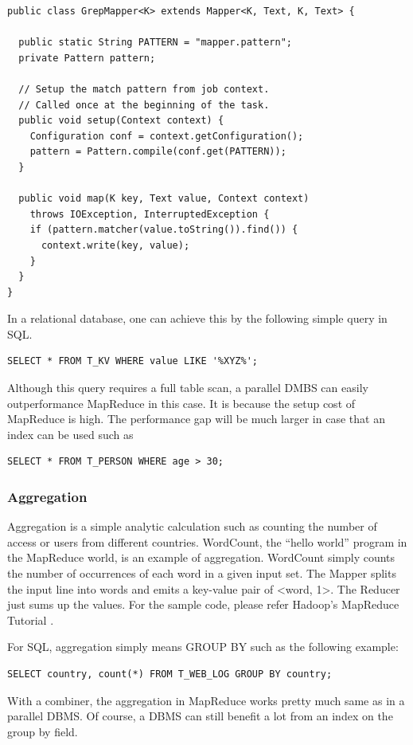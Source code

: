 \documentclass[12pt]{book}
\begin{document}
\begin{lstlisting}
public class GrepMapper<K> extends Mapper<K, Text, K, Text> {

  public static String PATTERN = "mapper.pattern";
  private Pattern pattern;

  // Setup the match pattern from job context.
  // Called once at the beginning of the task.
  public void setup(Context context) {
    Configuration conf = context.getConfiguration();
    pattern = Pattern.compile(conf.get(PATTERN));
  }

  public void map(K key, Text value, Context context)
    throws IOException, InterruptedException {
    if (pattern.matcher(value.toString()).find()) {
      context.write(key, value);
    }
  }
}
\end{lstlisting}
In a relational database, one can achieve this by the following simple query in SQL.

\lstset{language=SQL}
\begin{lstlisting}
SELECT * FROM T_KV WHERE value LIKE '%XYZ%';
\end{lstlisting}
Although this query requires a full table scan, a parallel DMBS can easily outperformance MapReduce in this case. It is because the setup cost of MapReduce is high.
The performance gap will be much larger in case that an index can be used such as

\begin{lstlisting}
SELECT * FROM T_PERSON WHERE age > 30;
\end{lstlisting}
 

\subsubsection{Aggregation}

Aggregation is a simple analytic calculation such as counting the number of access or users from different countries. WordCount, the ``hello world'' program in the MapReduce world, is an example of aggregation. WordCount simply counts the number of occurrences of each word in a given input set. The Mapper splits the input line into words  and emits a key-value pair of \textless word, 1\textgreater. The Reducer just sums up the values. For the sample code, please refer Hadoop's MapReduce Tutorial \cite{MapReduceTutorial}.

For SQL, aggregation simply means GROUP BY such as the following example:
\begin{lstlisting}
SELECT country, count(*) FROM T_WEB_LOG GROUP BY country;
\end{lstlisting}
With a combiner, the aggregation in MapReduce works pretty much same as in a parallel DBMS. Of course, a DBMS can still benefit a lot from an index on the group by field.
\end{document}
